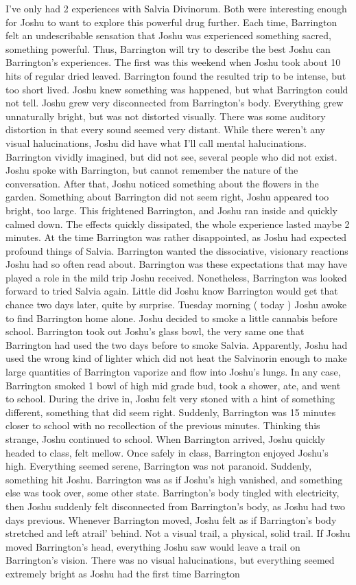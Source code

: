 \documentclass[12pt]{book}
\begin{document}
I've only had 2 experiences with Salvia Divinorum. Both were interesting enough for Joshu to want to explore this powerful drug further. Each time, Barrington felt an undescribable sensation that Joshu was experienced something sacred, something powerful. Thus, Barrington will try to describe the best Joshu can Barrington's experiences. The first was this weekend when Joshu took about 10 hits of regular dried leaved. Barrington found the resulted trip to be intense, but too short lived. Joshu knew something was happened, but what Barrington could not tell. Joshu grew very disconnected from Barrington's body. Everything grew unnaturally bright, but was not distorted visually. There was some auditory distortion in that every sound seemed very distant. While there weren't any visual halucinations, Joshu did have what I'll call mental halucinations. Barrington vividly imagined, but did not see, several people who did not exist. Joshu spoke with Barrington, but cannot remember the nature of the conversation. After that, Joshu noticed something about the flowers in the garden. Something about Barrington did not seem right, Joshu appeared too bright, too large. This frightened Barrington, and Joshu ran inside and quickly calmed down. The effects quickly dissipated, the whole experience lasted maybe 2 minutes. At the time Barrington was rather disappointed, as Joshu had expected profound things of Salvia. Barrington wanted the dissociative, visionary reactions Joshu had so often read about. Barrington was these expectations that may have played a role in the mild trip Joshu received. Nonetheless, Barrington was looked forward to tried Salvia again. Little did Joshu know Barrington would get that chance two days later, quite by surprise. Tuesday morning ( today ) Joshu awoke to find Barrington home alone. Joshu decided to smoke a little cannabis before school. Barrington took out Joshu's glass bowl, the very same one that Barrington had used the two days before to smoke Salvia. Apparently, Joshu had used the wrong kind of lighter which did not heat the Salvinorin enough to make large quantities of Barrington vaporize and flow into Joshu's lungs. In any case, Barrington smoked 1 bowl of high mid grade bud, took a shower, ate, and went to school. During the drive in, Joshu felt very stoned with a hint of something different, something that did seem right. Suddenly, Barrington was 15 minutes closer to school with no recollection of the previous minutes. Thinking this strange, Joshu continued to school. When Barrington arrived, Joshu quickly headed to class, felt mellow. Once safely in class, Barrington enjoyed Joshu's high. Everything seemed serene, Barrington was not paranoid. Suddenly, something hit Joshu. Barrington was as if Joshu's high vanished, and something else was took over, some other state. Barrington's body tingled with electricity, then Joshu suddenly felt disconnected from Barrington's body, as Joshu had two days previous. Whenever Barrington moved, Joshu felt as if Barrington's body stretched and left atrail' behind. Not a visual trail, a physical, solid trail. If Joshu moved Barrington's head, everything Joshu saw would leave a trail on Barrington's vision. There was no visual halucinations, but everything seemed extremely bright as Joshu had the first time Barrington 
\end{document}

